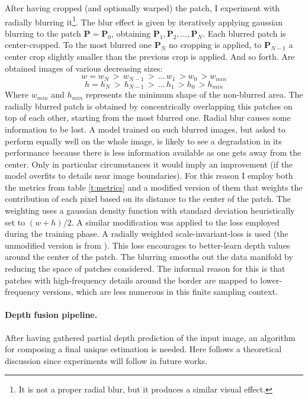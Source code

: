 After having cropped (and optionally warped) the patch, I experiment with radially blurring it\footnote{It is not a proper radial blur, but it produces a similar visual effect.}.
The blur effect is given by iteratively applying gaussian blurring to the patch $\mathbf{P} = \mathbf{P}_{0}$, obtaining $\mathbf{P}_{1}, \mathbf{P}_{2}, \dotsc, \mathbf{P}_{N}$.
Each blurred patch is center-cropped.
To the most blurred one $\mathbf{P}_{N}$ no cropping is applied, to $\mathbf{P}_{N-1}$ a center crop slightly smaller than the previous crop is applied.
And so forth.
Are obtained images of various decreasing sizes:
\[
    w = w_{N} \, > \, w_{N-1} \, > \, \dotsc \, w_{1} \, > w_{0} \, > w_{min}
\]\[
    h = h_{N} \, > \, h_{N-1} \, > \, \dotsc \, h_{1} \, > h_{0} \, > h_{min}
\]
Where $w_{min}$ and $h_{min}$ represents the minimum shape of the non-blurred area.
The radially blurred patch is obtained by concentrically overlapping this patches on top of each other, starting from the most blurred one.
Radial blur causes some information to be lost.
A model trained on such blurred images, but asked to perform equally well on the whole image, is likely to see a degradation in its performance because there is less information available as one gets away from the center.
Only in particular circumstances it would imply an improvement (if the model overfits to details near image boundaries).
For this reason I employ both the metrics from table \ref{t:metrics} and a modified version of them that weights the contribution of each pixel based on its distance to the center of the patch.
The weighting uses a gaussian density function with standard deviation heuristically set to $(w + h) / 2$.
A similar modification was applied to the loss employed during the training phase.
A radially weighted scale-invariant-loss is used (the unmodified version is from \cite{Eigen}).
This loss encourages to better-learn depth values around the center of the patch.
The blurring smooths out the data manifold by reducing the space of patches considered.
The informal reason for this is that patches with high-frequency details around the border are mapped to lower-frequency versions, which are less numerous in this finite sampling context.

\paragraph{Depth fusion pipeline.}
After having gathered partial depth prediction of the input image, an algorithm for composing a final unique estimation is needed.
Here follows a theoretical discussion since experiments will follow in future works.

